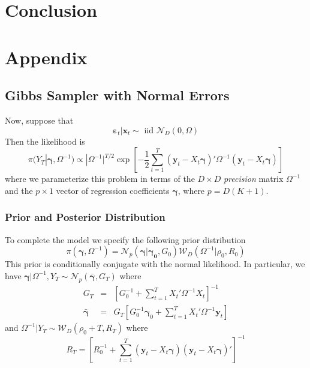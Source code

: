 \documentclass[12pt]{article}
\begin{document}
\section{Conclusion}

\section{Appendix}
\subsection{Gibbs Sampler with Normal Errors}
Now, suppose that 
\begin{equation*}
\boldsymbol{\varepsilon}_t|\mathbf{x}_t \sim \mbox{ iid } \mathcal{N}_D(0, \Omega)
\end{equation*}
Then the likelihood is 
\begin{equation*}
\pi(Y_T|\boldsymbol{\gamma},\Omega^{-1}) \propto |\Omega^{-1}|^{T/2} \exp\left[ -\frac{1}{2} \sum_{t=1}^T \left(\mathbf{y}_t - X_t \boldsymbol{\gamma} \right)' \Omega^{-1} \left(\mathbf{y}_t - X_t \boldsymbol{\gamma} \right)\right]
\end{equation*}
where we parameterize this problem in terms of the $D\times D$ \emph{precision} matrix $\Omega^{-1}$ and the $p\times1$ vector of regression coefficients $\boldsymbol{\gamma}$, where $p = D(K+1)$. \\
\subsubsection{Prior and Posterior Distribution}
To complete the model we specify the following prior distribution
\begin{equation*}
\pi (\boldsymbol{\gamma},\Omega^{-1})=\mathcal{N}_{p}\left( \boldsymbol{\gamma} |\boldsymbol{\gamma_{0}},G_{0}\right)
\mathcal{W}_{D}\left(\Omega ^{-1}|\rho_{0}, R_{0}\right)
\end{equation*}
This prior is conditionally conjugate with the normal likelihood.
In particular, we have 
$\boldsymbol{\gamma}|\Omega^{-1},Y_T \sim \mathcal{N}_p\left( \bar{\boldsymbol{\gamma}},G_T \right)$
where
\begin{eqnarray*}
	G_T &=& \left[ G_0^{-1} + \sum_{t=1}^T X_t' \Omega^{-1} X_t \right]^{-1}\\
	\bar{\boldsymbol{\gamma}} &=& G_T \left[ G_0^{-1}\boldsymbol{\gamma}_0 + \sum_{t=1}^{T} X_t'\Omega^{-1}\mathbf{y}_t \right]
\end{eqnarray*}
and
$\Omega^{-1}|Y_T \sim \mathcal{W}_D\left(\rho_0 + T, R_T \right)$
where
\begin{equation*}
R_T = \left[ R_0^{-1} + \sum_{t=1}^{T} \left( \mathbf{y}_t - X_t \boldsymbol{\gamma} \right)\left( \mathbf{y}_t - X_t \boldsymbol{\gamma} \right)' \right]^{-1}
\end{equation*}
\end{document}
